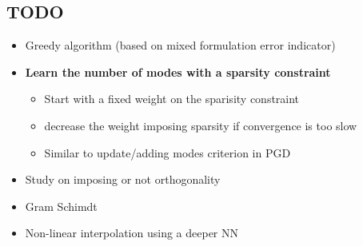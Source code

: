\subsection{TODO}
\begin{itemize}
    \item Greedy algorithm (based on mixed formulation error indicator)
    \item \textbf{Learn the number of modes with a sparsity constraint}
    \begin{itemize}
        \item Start with a fixed weight on the sparisity constraint 
        \item decrease the weight imposing sparsity if convergence is too slow
        \item Similar to update/adding modes criterion in PGD
    \end{itemize}
    \item Study on imposing or not orthogonality
    \item Gram Schimdt
    \item Non-linear interpolation using a deeper NN
\end{itemize}

